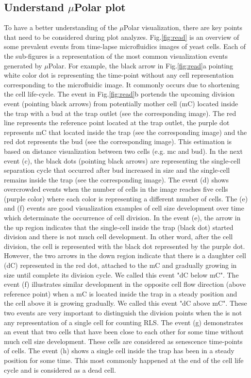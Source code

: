 \documentclass[conference]{IEEEtran}
\begin{document}


\subsection{Understand $\mu$Polar plot}
To have a better understanding of the $\mu$Polar visualization, there are key points that need to be considered during plot analyzes. Fig.\ref{fig:read} is an overview of some prevalent events from time-lapse microfluidics images of yeast cells. Each of the sub-figures is a representation of the most common visualization events generated by $\mu$Polar. For example, the black arrow in Fig.\ref{fig:read}a pointing white color dot is representing the time-point without any cell representation corresponding to the microfluidic image. It commonly occurs due to shortening the cell life-cycle. The event in Fig.\ref{fig:read}b portends the upcoming division event (pointing black arrows) from potentially mother cell (mC) located inside the trap with a bud at the trap outlet (see the corresponding image). The red line represents the reference point located at the trap outlet, the purple dot represents mC that located inside the trap (see the corresponding image) and the red dot represents the bud (see the corresponding image). This estimation is based on distance visualization between two cells (e.g. mc and bud). In the next event (c), the black dots (pointing black arrows) are representing the single-cell separation cycle that occurred after bud increased in size and the single-cell remains inside the trap (see the corresponding image). The event (d) shows overcrowded events when the number of cells in the image reaches five cells (purple color) where each color is representing a different number of cells. The (e) and (f) events are good visualization examples of cell size development over time which determinate the occurrence of cell division. In the event (e), the arrow in the up region indicates that the single-cell inside the trap (black dot) started division and there is not much cell development. In other word, after the cell division, the cell is represented with the black dot represented by the purple dot. However, the two arrows in the down region indicate that there is a daughter cell (dC) represented in the red dot, attached to the mC and gradually growing in size until complete its division cycle.  We called this event "dC below mC". The event (f) illustrates similar development in the opposite cell flow direction (above reference point) when a mC is located inside the trap in a steady position and the cell above it is growing gradually. We called this event "dC above mC". These two events are very important to distinguish the division points when the is not any representation of a single cell for counting RLS. The event (g) demonstrates an event that two cells that have been close to each other for some time without much cell size development. These cells are considered as senescence time-points of cells. The event (h) shows a single cell inside the trap has been in a steady position for some time. This most commonly happened at the end of the cell life cycle and is considered as a dead cell.
\end{document}
